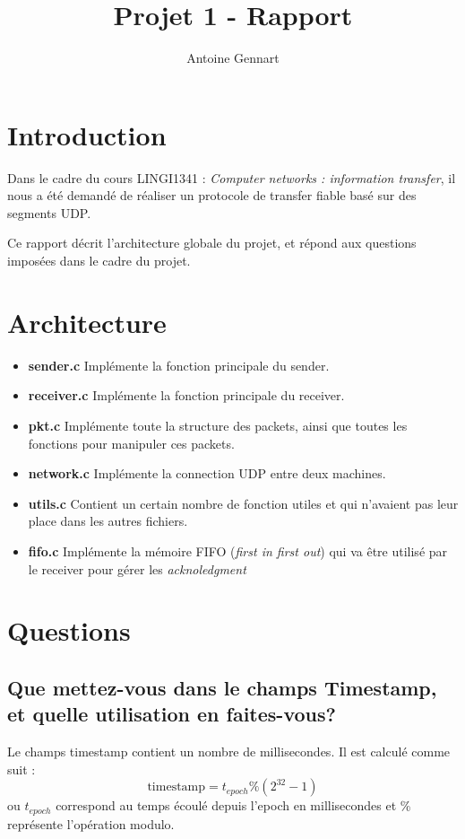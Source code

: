 \documentclass[10pt,a4paper]{article}
\author{Antoine Gennart}
\title{Projet 1 - Rapport}
\begin{document}
\maketitle


\section{Introduction}
Dans le cadre du cours LINGI1341 : \textit{Computer networks : information transfer}, il nous a été demandé de réaliser un protocole de transfer fiable basé sur des segments UDP.

Ce rapport décrit l'architecture globale du projet, et répond aux questions imposées dans le cadre du projet.

\section{Architecture}

\begin{itemize}
	\item \textbf{sender.c} Implémente la fonction principale du sender.
	\item \textbf{receiver.c} Implémente la fonction principale du receiver.
	\item \textbf{pkt.c} Implémente toute la structure des packets, ainsi que toutes les fonctions pour manipuler ces packets.
	\item \textbf{network.c} Implémente la connection UDP entre deux machines.
	\item \textbf{utils.c} Contient un certain nombre de fonction utiles et qui n'avaient pas leur place dans les autres fichiers.
	\item \textbf{fifo.c} Implémente la mémoire FIFO (\textit{first in first out}) qui va être utilisé par le receiver pour gérer les \textit{acknoledgment}
\end{itemize}

\section{Questions}
\subsection{Que mettez-vous dans le champs Timestamp, et quelle utilisation en faites-vous?}
Le champs timestamp contient un nombre de millisecondes. Il est calculé comme suit : 
\begin{equation*}
	\text{timestamp} = t_{epoch} \% (2^{32}-1)
\end{equation*}
ou $t_{epoch}$ correspond au temps écoulé depuis l'epoch en millisecondes et \% représente l'opération modulo.
\end{document}
